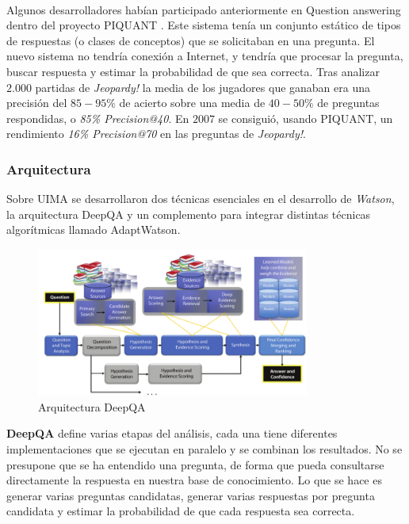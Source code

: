 \documentclass[paper=a4, fontsize=10pt]{scrartcl} %
\numberwithin{equation}{section} %
\numberwithin{figure}{section} %
\numberwithin{table}{section} %
\begin{document}
\

Algunos desarrolladores habían participado anteriormente en Question answering dentro del proyecto PIQUANT \cite{piquant}. %
Este sistema tenía un conjunto estático de tipos de respuestas (o clases de conceptos) que se solicitaban en una pregunta.
El nuevo sistema no tendría conexión a Internet, y tendría que procesar la pregunta, buscar respuesta y estimar la probabilidad de que sea correcta.
Tras analizar $2.000$ partidas de \textit{Jeopardy!} la media de los jugadores que ganaban era una precisión del $85-95\%$ de acierto sobre una media de $40-50\%$ de preguntas respondidas, o 
\textit{85\% Precision@40}.
En $2007$ se consiguió, usando PIQUANT, un rendimiento \textit{16\% Precision@70} en las preguntas de \textit{Jeopardy!}.


\subsubsection{Arquitectura}
Sobre UIMA se desarrollaron dos técnicas esenciales en el desarrollo de \textit{Watson}, la arquitectura DeepQA %
y un complemento para integrar distintas técnicas algorítmicas llamado AdaptWatson. %

\begin{figure}[H]
	\centering
	\label{tiw-deepqa}
	\includegraphics[width=0.8\textwidth]{./Imagenes/deepQA.png}
	\caption{Arquitectura DeepQA}
\end{figure}

\textbf{DeepQA} define varias etapas del análisis, cada una tiene diferentes implementaciones que se ejecutan en paralelo y se combinan los resultados.
No se presupone que se ha entendido una pregunta, de forma que pueda consultarse directamente la respuesta en nuestra base de conocimiento.
Lo que se hace es generar varias preguntas candidatas, generar varias respuestas por pregunta candidata y estimar la probabilidad de que cada respuesta sea correcta.
\end{document}
